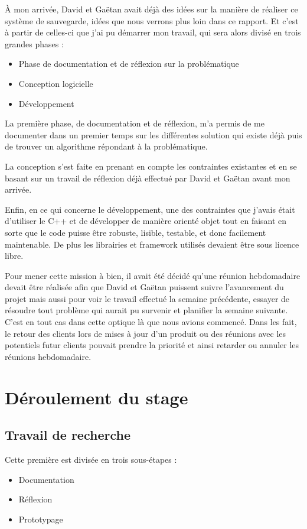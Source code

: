 \documentclass[a4paper,10pt, twoside]{report}
\begin{document}
\begin{spacing}{1.2}
\`A mon arriv\'ee, David et Ga\"etan avait d\'ej\`a des id\'ees sur la
mani\`ere de r\'ealiser ce syst\`eme de sauvegarde, id\'ees que nous verrons
plus loin dans ce rapport. Et c'est \`a partir de celles-ci que j'ai pu
d\'emarrer mon travail, qui sera alors divis\'e en trois grandes phases :

\begin{itemize}
 \item Phase de documentation et de r\'eflexion sur la probl\'ematique
 \item Conception logicielle
 \item D\'eveloppement
\end{itemize}

La premi\`ere phase, de documentation et de r\'eflexion, m'a permis de me
documenter dans un premier temps sur les diff\'erentes solution qui existe
d\'ej\`a puis de trouver un algorithme r\'epondant \`a la probl\'ematique.

La conception s'est faite en prenant en compte les contraintes existantes
et en se basant sur un travail de r\'eflexion d\'ej\`a effectu\'e par David et
Ga\"etan avant mon arriv\'ee.

Enfin, en ce qui concerne le d\'eveloppement, une des contraintes que j'avais
\'etait d'utiliser le C++ et de d\'evelopper de mani\`ere orient\'e objet tout
en faisant en sorte que le code puisse \^etre robuste, lisible, testable, et
donc facilement maintenable. De plus les librairies et framework utilis\'es
devaient \^etre sous licence libre.

Pour mener cette mission \`a bien, il avait \'et\'e d\'ecid\'e qu'une r\'eunion
hebdomadaire devait \^etre r\'ealis\'ee afin que David et Ga\"etan puissent
suivre l'avancement du projet mais aussi pour voir le travail effectu\'e la
semaine pr\'ec\'edente, essayer de r\'esoudre tout probl\`eme qui aurait pu
survenir et planifier la semaine suivante.
C'est en tout cas dans cette optique l\`a que nous avions commenc\'e. Dans les
fait, le retour des clients lors de mises \`a jour d'un produit ou des
r\'eunions avec les potentiels futur clients pouvait prendre la priorit\'e et
ainsi retarder ou annuler les r\'eunions hebdomadaire.

\section{D\'eroulement du stage}
\subsection{Travail de recherche}
Cette premi\`ere est divis\'ee en trois sous-\'etapes :
\begin{itemize}
 \item Documentation
 \item R\'eflexion
 \item Prototypage
\end{itemize}


\end{spacing}
\end{document}

